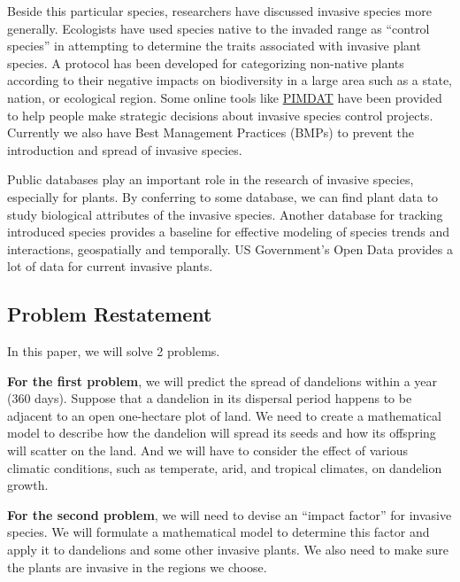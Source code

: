 \documentclass[12pt]{article}
\begin{document}
	Beside this particular species, researchers have discussed invasive species more generally.  Ecologists have used species native to the invaded range as ``control species'' in attempting to determine the traits associated with invasive plant species\autocite{muth2006traits}.  A protocol has been developed for categorizing non-native plants according to their negative impacts on biodiversity in a large area such as a state, nation, or ecological region\autocite{randall2008invasive}.  Some online tools like \href{https://www.imapinvasives.org/decision-analysis-tool}{PIMDAT}\autocite{PIMDAT} have been provided to help people make strategic decisions about invasive species control projects.  Currently we also have Best Management Practices (BMPs) to prevent the introduction and spread of invasive species\autocite{BMP}.
	
	Public databases play an important role in the research of invasive species, especially for plants. By conferring to some database, we can find plant data to study biological attributes of the invasive species\autocite{USDA}.  Another database for tracking introduced species provides a baseline for effective modeling of species trends and interactions, geospatially and temporally\autocite{US-RIIS}.  US Government's Open Data provides a lot of data for current invasive plants\autocite{DATAGOV}.
	\newpage
	
	\subsection{Problem Restatement}

	In this paper, we will solve 2 problems.
	
	\textbf{For the first problem}, we will predict the spread of dandelions within a year (360 days).  Suppose that a dandelion in its dispersal period happens to be adjacent to an open one-hectare plot of land.  We need to create a mathematical model to describe how the dandelion will spread its seeds and how its offspring will scatter on the land.  And we will have to consider the effect of various climatic conditions, such as temperate, arid, and tropical climates, on dandelion growth.
	
	\textbf{For the second problem}, we will need to devise an ``impact factor'' for invasive species.  We will formulate a mathematical model to determine this factor and apply it to dandelions and some other invasive plants.  We also need to make sure the plants are invasive in the regions we choose.
\end{document}
